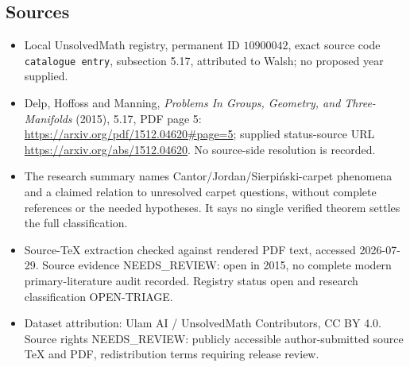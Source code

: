 \documentclass[11pt]{article}
\begin{document}
\subsection{Sources}
\begin{itemize}
\item Local UnsolvedMath registry, permanent ID \(10900042\), exact source code \texttt{catalogue entry}, subsection 5.17, attributed to Walsh; no proposed year supplied.
\item Delp, Hoffoss and Manning, \emph{Problems In Groups, Geometry, and Three-Manifolds} (2015), 5.17, PDF page 5: \url{https://arxiv.org/pdf/1512.04620#page=5}; supplied status-source URL \url{https://arxiv.org/abs/1512.04620}. No source-side resolution is recorded.
\item The research summary names Cantor/Jordan/Sierpiński-carpet phenomena and a claimed relation to unresolved carpet questions, without complete references or the needed hypotheses. It says no single verified theorem settles the full classification.
\item Source-TeX extraction checked against rendered PDF text, accessed 2026-07-29. Source evidence NEEDS\_REVIEW: open in 2015, no complete modern primary-literature audit recorded. Registry status open and research classification OPEN-TRIAGE.
\item Dataset attribution: Ulam AI / UnsolvedMath Contributors, CC BY 4.0. Source rights NEEDS\_REVIEW: publicly accessible author-submitted source TeX and PDF, redistribution terms requiring release review.
\end{itemize}
\end{document}
